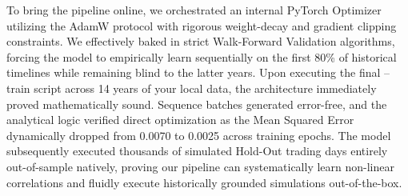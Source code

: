 \documentclass{article} %
\begin{document}
To bring the pipeline online, we orchestrated an internal PyTorch Optimizer utilizing the AdamW protocol with rigorous weight-decay and gradient clipping constraints. We effectively baked in strict Walk-Forward Validation algorithms, forcing the model to empirically learn sequentially on the first 80\% of historical timelines while remaining blind to the latter years. Upon executing the final --train script across 14 years of your local data, the architecture immediately proved mathematically sound. Sequence batches generated error-free, and the analytical logic verified direct optimization as the Mean Squared Error dynamically dropped from 0.0070 to 0.0025 across training epochs. The model subsequently executed thousands of simulated Hold-Out trading days entirely out-of-sample natively, proving our pipeline can systematically learn non-linear correlations and fluidly execute historically grounded simulations out-of-the-box.




\end{document}

